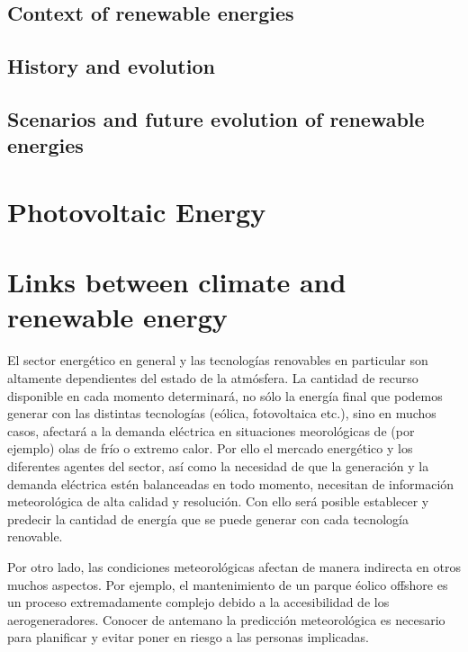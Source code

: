 
\subsection{Context of renewable energies}
\subsection{History and evolution}
\subsection{Scenarios and future evolution of renewable energies}
\section{Photovoltaic Energy}
\section{Links between climate and renewable energy}

El sector energético en general y las tecnologías renovables en particular son altamente dependientes del estado de la atmósfera. La cantidad de recurso disponible en cada momento determinará, no sólo la energía final que podemos generar con las distintas tecnologías (eólica, fotovoltaica etc.), sino en muchos casos, afectará a la demanda eléctrica en situaciones meorológicas de (por ejemplo) olas de frío o extremo calor. Por ello el mercado energético y los diferentes agentes del sector, así como la necesidad de que la generación y la demanda eléctrica estén balanceadas en todo momento, necesitan de información meteorológica de alta calidad y resolución. Con ello será posible establecer y predecir la cantidad de energía que se puede generar con cada tecnología renovable. 

Por otro lado, las condiciones meteorológicas afectan de manera indirecta en otros muchos aspectos. Por ejemplo, el mantenimiento de un parque éolico offshore es un proceso extremadamente complejo debido a la accesibilidad de los aerogeneradores. Conocer de antemano la predicción meteorológica es necesario para planificar y evitar poner en riesgo a las personas implicadas.  

